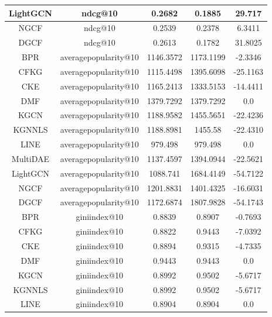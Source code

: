 \begin{table}[H]
{\begin{tabular}{|c|c|c|c|c|}
            LightGCN & ndcg@10 & 0.2682 & 0.1885 & 29.717\\
            \hline
            NGCF & ndcg@10 & 0.2539 & 0.2378 & 6.3411\\
            \hline
            DGCF & ndcg@10 & 0.2613 & 0.1782 & 31.8025\\
            \hline
            BPR & averagepopularity@10 & 1146.3572 & 1173.1199 & -2.3346\\
            \hline
            CFKG & averagepopularity@10 & 1115.4498 & 1395.6098 & -25.1163\\
            \hline
            CKE & averagepopularity@10 & 1165.2413 & 1333.5153 & -14.4411\\
            \hline
            DMF & averagepopularity@10 & 1379.7292 & 1379.7292 & 0.0\\
            \hline
            KGCN & averagepopularity@10 & 1188.9582 & 1455.5651 & -22.4236\\
            \hline
            KGNNLS & averagepopularity@10 & 1188.8981 & 1455.58 & -22.4310\\
            \hline
            LINE & averagepopularity@10 & 979.498 & 979.498 & 0.0\\
            \hline
            MultiDAE & averagepopularity@10 & 1137.4597 & 1394.0944 & -22.5621\\
            \hline
            LightGCN & averagepopularity@10 & 1088.741 & 1684.4149 & -54.7122\\
            \hline
            NGCF & averagepopularity@10 & 1201.8831 & 1401.4325 & -16.6031\\
            \hline
            DGCF & averagepopularity@10 & 1172.6874 & 1807.9828 & -54.1743\\
            \hline
            BPR & giniindex@10 & 0.8839 & 0.8907 & -0.7693\\
            \hline
            CFKG & giniindex@10 & 0.8822 & 0.9443 & -7.0392\\
            \hline
            CKE & giniindex@10 & 0.8894 & 0.9315 & -4.7335\\
            \hline
            DMF & giniindex@10 & 0.9443 & 0.9443 & 0.0\\
            \hline
            KGCN & giniindex@10 & 0.8992 & 0.9502 & -5.6717\\
            \hline
            KGNNLS & giniindex@10 & 0.8992 & 0.9502 & -5.6717\\
            \hline
            LINE & giniindex@10 & 0.8904 & 0.8904 & 0.0\\

\end{tabular}}
\end{table}
